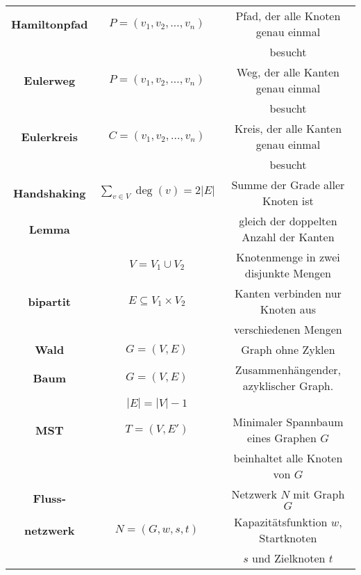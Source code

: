 \documentclass[12pt]{scrartcl}
\begin{document}
\begin{tabular}{ c | c | c }
    \hline
    \textbf{Hamiltonpfad} & $P = (v_1, v_2, \ldots, v_n)$   & Pfad, der alle Knoten genau einmal     \\
                          &                                 & besucht                                \\
    \hline
    \textbf{Eulerweg}     & $P = (v_1, v_2, \ldots, v_n)$   & Weg, der alle Kanten genau einmal      \\
                          &                                 & besucht                                \\
    \hline
    \textbf{Eulerkreis}   & $C = (v_1, v_2, \ldots, v_n)$   & Kreis, der alle Kanten genau einmal    \\
                          &                                 & besucht                                \\
    \hline
    \textbf{Handshaking}  & $\sum_{v \in V} \deg(v) = 2|E|$ & Summe der Grade aller Knoten ist       \\
    \textbf{Lemma}        &                                 & gleich der doppelten Anzahl der Kanten \\
    \hline
                          & $V = V_1 \cup V_2$              & Knotenmenge in zwei disjunkte Mengen   \\
    \textbf{bipartit}     & $E \subseteq V_1 \times V_2$    & Kanten verbinden nur Knoten aus        \\
                          &                                 & verschiedenen Mengen                   \\
    \hline
    \textbf{Wald}         & $G = (V, E)$                    & Graph ohne Zyklen                      \\
    \hline
    \textbf{Baum}         & $G = (V, E)$                    & Zusammenhängender, azyklischer Graph.  \\
                          & $|E| = |V| - 1$                 &                                        \\
    \hline
    \textbf{MST}          & $T = (V, E')$                   & Minimaler Spannbaum eines Graphen $G$  \\
                          &                                 & beinhaltet alle Knoten von $G$         \\
    \hline
    \textbf{Fluss-}       &                                 & Netzwerk $N$ mit Graph $G$             \\
    \textbf{netzwerk}     & $N = (G, w, s, t)$              & Kapazitätsfunktion $w$, Startknoten    \\
                          &                                 & $s$ und Zielknoten $t$                 \\
\end{tabular}
\pagebreak
\end{document}
